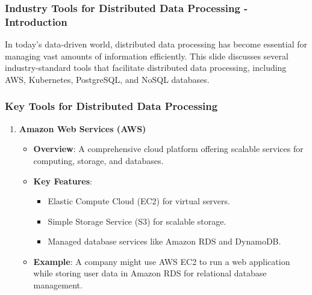 \documentclass[aspectratio=169]{beamer}
\begin{document}
\begin{frame}[fragile]
  \frametitle{Industry Tools for Distributed Data Processing - Introduction}
  In today's data-driven world, distributed data processing has become essential for managing vast amounts of information efficiently. This slide discusses several industry-standard tools that facilitate distributed data processing, including AWS, Kubernetes, PostgreSQL, and NoSQL databases.
\end{frame}

\begin{frame}[fragile]
  \frametitle{Key Tools for Distributed Data Processing}
  \begin{enumerate}
    \item \textbf{Amazon Web Services (AWS)}
      \begin{itemize}
        \item \textbf{Overview}: A comprehensive cloud platform offering scalable services for computing, storage, and databases.
        \item \textbf{Key Features}:
          \begin{itemize}
            \item Elastic Compute Cloud (EC2) for virtual servers.
            \item Simple Storage Service (S3) for scalable storage.
            \item Managed database services like Amazon RDS and DynamoDB.
          \end{itemize}
        \item \textbf{Example}: A company might use AWS EC2 to run a web application while storing user data in Amazon RDS for relational database management.
      \end{itemize}
  \end{enumerate}
\end{frame}
\end{document}
